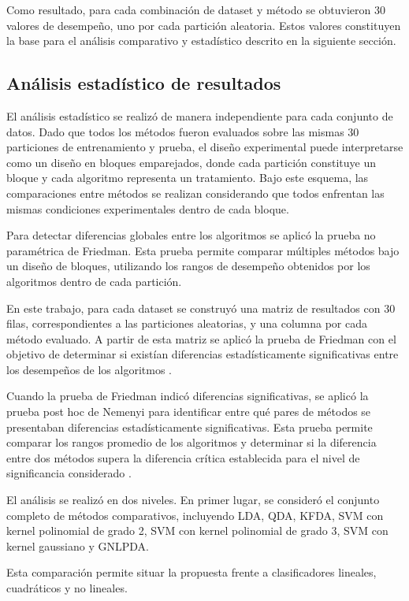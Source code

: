 Como resultado, para cada combinación de dataset y método se obtuvieron 30 valores de desempeño, uno por cada partición aleatoria. Estos valores constituyen la base para el análisis comparativo y estadístico descrito en la siguiente sección.

\subsection{Análisis estadístico de resultados}

El análisis estadístico se realizó de manera independiente para cada conjunto de datos. Dado que todos los métodos fueron evaluados sobre las mismas 30 particiones de entrenamiento y prueba, el diseño experimental puede interpretarse como un diseño en bloques emparejados, donde cada partición constituye un bloque y cada algoritmo representa un tratamiento. Bajo este esquema, las comparaciones entre métodos se realizan considerando que todos enfrentan las mismas condiciones experimentales dentro de cada bloque.

Para detectar diferencias globales entre los algoritmos se aplicó la prueba no paramétrica de Friedman. Esta prueba permite comparar múltiples métodos bajo un diseño de bloques, utilizando los rangos de desempeño obtenidos por los algoritmos dentro de cada partición.

En este trabajo, para cada dataset se construyó una matriz de resultados con 30 filas, correspondientes a las particiones aleatorias, y una columna por cada método evaluado. A partir de esta matriz se aplicó la prueba de Friedman con el objetivo de determinar si existían diferencias estadísticamente significativas entre los desempeños de los algoritmos \cite{pereira2015overview}.

Cuando la prueba de Friedman indicó diferencias significativas, se aplicó la prueba post hoc de Nemenyi para identificar entre qué pares de métodos se presentaban diferencias estadísticamente significativas. Esta prueba permite comparar los rangos promedio de los algoritmos y determinar si la diferencia entre dos métodos supera la diferencia crítica establecida para el nivel de significancia considerado \cite{demvsar2006statistical}.

El análisis se realizó en dos niveles. En primer lugar, se consideró el conjunto completo de métodos comparativos, incluyendo LDA, QDA, KFDA, SVM con kernel polinomial de grado 2, SVM con kernel polinomial de grado 3, SVM con kernel gaussiano y GNLPDA.

Esta comparación permite situar la propuesta frente a clasificadores lineales, cuadráticos y no lineales.

